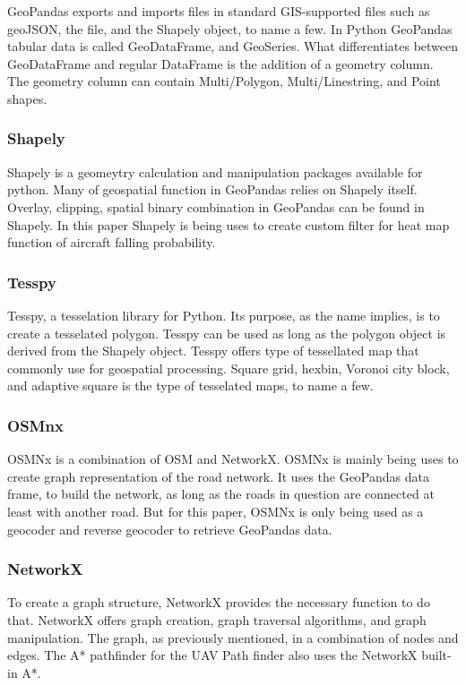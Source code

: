 \documentclass[12pt]{report}
\begin{document}
        GeoPandas exports and imports files in standard GIS-supported files such as geoJSON, the file, and the Shapely
        object, to name a few. In Python GeoPandas tabular data is called GeoDataFrame, and GeoSeries. What
        differentiates between GeoDataFrame and regular DataFrame is the addition of a geometry column. The geometry
        column can contain Multi/Polygon, Multi/Linestring, and Point shapes.

        \subsubsection{Shapely}
        Shapely is a geomeytry calculation and manipulation packages available for python. Many of geospatial function
        in GeoPandas relies on Shapely itself. Overlay, clipping, spatial binary combination in GeoPandas can be found
        in Shapely. In this paper Shapely is being uses to create custom filter for heat map function of aircraft
        falling probability.

        \subsubsection{Tesspy}
        Tesspy, a tesselation library for Python. Its purpose, as the name implies, is to create a tesselated polygon.
        Tesspy can be used as long as the polygon object is derived from the Shapely object. Tesspy offers type of
        tessellated map that commonly use for geospatial processing. Square grid, hexbin, Voronoi city block, and
        adaptive square is the type of tesselated maps, to name a few.

        \subsubsection{OSMnx}
        OSMNx is a combination of OSM and NetworkX. OSMNx is mainly being uses to create graph representation of the
        road network. It uses the GeoPandas data frame, to build the network, as long as the roads in question are
        connected at least with another road. But for this paper, OSMNx is only being used as a geocoder and reverse
        geocoder to retrieve GeoPandas data.

        \subsubsection{NetworkX}
        To create a graph structure, NetworkX provides the necessary function to do that. NetworkX offers graph
        creation, graph traversal algorithms, and graph manipulation. The graph, as previously mentioned, in a
        combination of nodes and edges. The A* pathfinder for the UAV Path finder also uses the NetworkX built-in A*.
\end{document}
